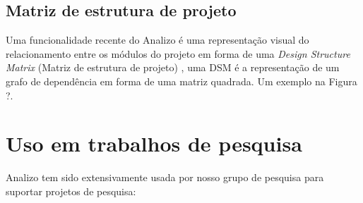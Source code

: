 \documentclass{article}
\begin{document}
\subsection{Matriz de estrutura de projeto}

Uma funcionalidade recente do Analizo é uma representação visual do
relacionamento entre os módulos do projeto em forma de uma {\it Design
Structure Matrix} (Matriz de estrutura de projeto) \cite{Maccormack2006}, uma
DSM é a representação de um grafo de dependência em forma de uma matriz
quadrada. Um exemplo na Figura ?.

\section{Uso em trabalhos de pesquisa}

Analizo tem sido extensivamente usada por nosso grupo de pesquisa para suportar
projetos de pesquisa:
\end{document}
